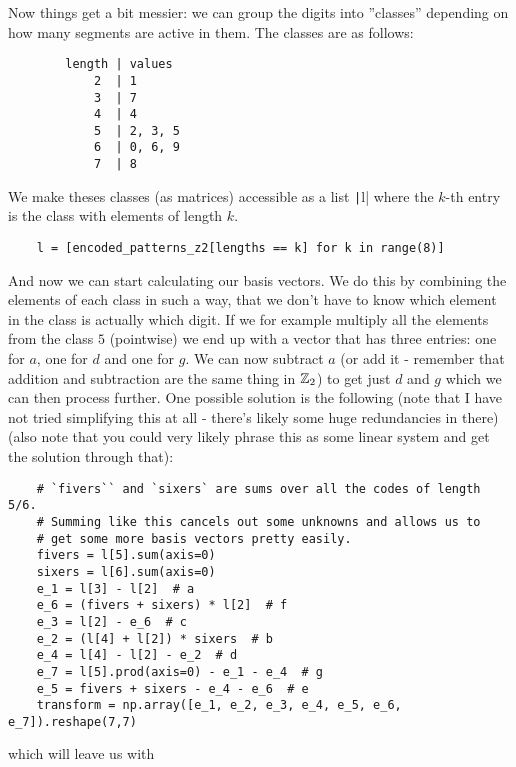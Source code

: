 \documentclass[a4paper,11pt]{article}
\begin{document}
Now things get a bit messier: we can group the digits into ''classes'' depending on how many segments are active in them. The classes are as follows:

\begin{center}
    \begin{verbatim}
        length | values
            2  | 1
            3  | 7
            4  | 4
            5  | 2, 3, 5
            6  | 0, 6, 9
            7  | 8
    \end{verbatim}
\end{center}

We make theses classes (as matrices) accessible as a list \texttt|l| where the $k$-th entry is the class with elements of length $k$.

\begin{verbatim}
    l = [encoded_patterns_z2[lengths == k] for k in range(8)]
\end{verbatim}

And now we can start calculating our basis vectors. We do this by combining the elements of each class in such a way, that we don't have to know which element in the class is actually which digit. If we for example multiply all the elements from the class $5$ (pointwise) we end up with a vector that has three entries: one for $a$, one for $d$ and one for $g$. We can now subtract $a$ (or add it - remember that addition and subtraction are the same thing in $\mathbb{Z}_2$) to get just $d$ and $g$ which we can then process further. One possible solution is the following (note that I have not tried simplifying this at all - there's likely some huge redundancies in there)(also note that you could very likely phrase this as some linear system and get the solution through that):

\begin{verbatim}
    # `fivers`` and `sixers` are sums over all the codes of length 5/6.
    # Summing like this cancels out some unknowns and allows us to
    # get some more basis vectors pretty easily.
    fivers = l[5].sum(axis=0)
    sixers = l[6].sum(axis=0)
    e_1 = l[3] - l[2]  # a
    e_6 = (fivers + sixers) * l[2]  # f
    e_3 = l[2] - e_6  # c
    e_2 = (l[4] + l[2]) * sixers  # b
    e_4 = l[4] - l[2] - e_2  # d
    e_7 = l[5].prod(axis=0) - e_1 - e_4  # g
    e_5 = fivers + sixers - e_4 - e_6  # e
    transform = np.array([e_1, e_2, e_3, e_4, e_5, e_6, e_7]).reshape(7,7)
\end{verbatim}

which will leave us with
\end{document}
